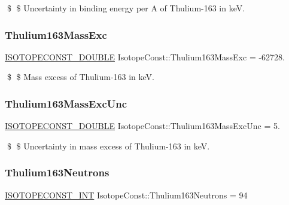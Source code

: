 \$ \$ Uncertainty in binding energy per A of Thulium-\/163 in keV. \mbox{\label{group___isotope_const-_thulium-_tm163_gaee27c2c63231e56d42159e442ea3572e}} 
\subsubsection{\texorpdfstring{Thulium163\+Mass\+Exc}{Thulium163MassExc}}
{\footnotesize\ttfamily \mbox{\hyperlink{group___isotope_const-_macros_ga8f45a7272ce02c0b4c65c44636ed719a}{I\+S\+O\+T\+O\+P\+E\+C\+O\+N\+S\+T\+\_\+\+D\+O\+U\+B\+LE}} Isotope\+Const\+::\+Thulium163\+Mass\+Exc = -\/62728.}

\$ \$ Mass excess of Thulium-\/163 in keV. \mbox{\label{group___isotope_const-_thulium-_tm163_ga6d07f5a1fd48ab6adf1844bc7a948b83}} 
\subsubsection{\texorpdfstring{Thulium163\+Mass\+Exc\+Unc}{Thulium163MassExcUnc}}
{\footnotesize\ttfamily \mbox{\hyperlink{group___isotope_const-_macros_ga8f45a7272ce02c0b4c65c44636ed719a}{I\+S\+O\+T\+O\+P\+E\+C\+O\+N\+S\+T\+\_\+\+D\+O\+U\+B\+LE}} Isotope\+Const\+::\+Thulium163\+Mass\+Exc\+Unc = 5.}

\$ \$ Uncertainty in mass excess of Thulium-\/163 in keV. \mbox{\label{group___isotope_const-_thulium-_tm163_gaced8897bb178e8523cad9430734e1340}} 
\subsubsection{\texorpdfstring{Thulium163\+Neutrons}{Thulium163Neutrons}}
{\footnotesize\ttfamily \mbox{\hyperlink{group___isotope_const-_macros_ga5f18360b3e99483a35c32d789e62621c}{I\+S\+O\+T\+O\+P\+E\+C\+O\+N\+S\+T\+\_\+\+I\+NT}} Isotope\+Const\+::\+Thulium163\+Neutrons = 94}

